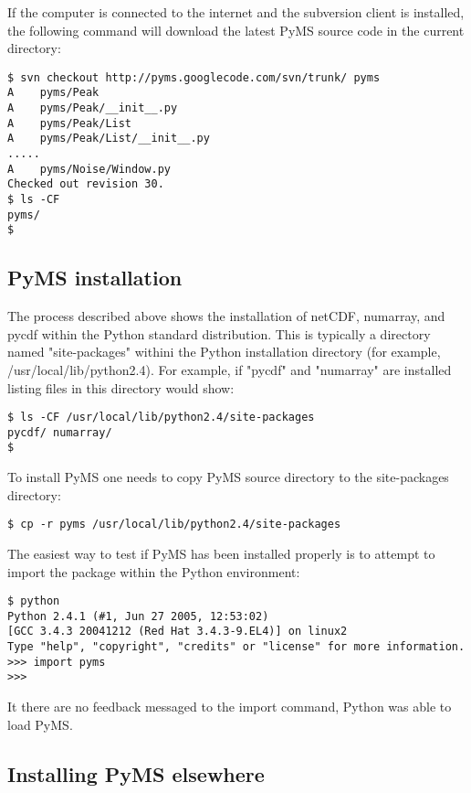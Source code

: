 If the computer is connected to the internet and the subversion client
is installed, the following command will download the latest PyMS 
source code in the current directory:

\begin{verbatim}
$ svn checkout http://pyms.googlecode.com/svn/trunk/ pyms
A    pyms/Peak
A    pyms/Peak/__init__.py
A    pyms/Peak/List
A    pyms/Peak/List/__init__.py
.....
A    pyms/Noise/Window.py
Checked out revision 30.
$ ls -CF
pyms/
$
\end{verbatim}

\subsection{PyMS installation}

The process described above shows the installation of netCDF, numarray,
and pycdf within the Python standard distribution. This is typically
a directory named "site-packages" withini the Python installation
directory (for example, /usr/local/lib/python2.4). For example, if
"pycdf" and "numarray" are installed listing files in this directory
would show:

\begin{verbatim}
$ ls -CF /usr/local/lib/python2.4/site-packages
pycdf/ numarray/
$ 
\end{verbatim}

To install PyMS one needs to copy PyMS source directory to
the site-packages directory:

\begin{verbatim}
$ cp -r pyms /usr/local/lib/python2.4/site-packages
\end{verbatim}

The easiest way to test if PyMS has been installed properly is 
to attempt to import the package within the Python environment:

\begin{verbatim}
$ python
Python 2.4.1 (#1, Jun 27 2005, 12:53:02) 
[GCC 3.4.3 20041212 (Red Hat 3.4.3-9.EL4)] on linux2
Type "help", "copyright", "credits" or "license" for more information.
>>> import pyms
>>>
\end{verbatim}

It there are no feedback messaged to the import command, Python
was able to load PyMS. 

\subsection{Installing PyMS elsewhere}

